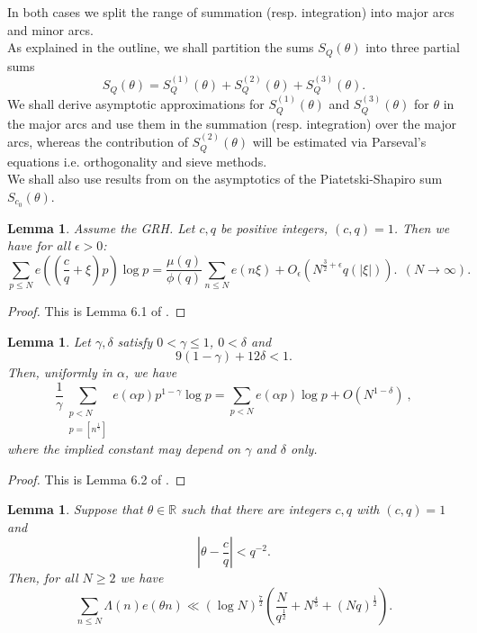 \documentclass{amsart}
\newtheorem{lemma}[theorem]{Lemma}
\numberwithin{equation}{subsection}
\begin{document}
In both cases we split the range of summation (resp. integration) into major arcs and minor arcs.\\
As explained in the outline, we shall partition the sums $S_Q(\theta)$ into three partial sums 
$$S_Q(\theta)=S_Q^{(1)}(\theta)+S_Q^{(2)}(\theta)+S_Q^{(3)}(\theta).$$
We shall derive asymptotic approximations for $S_Q^{(1)}(\theta)$ and $S_Q^{(3)}(\theta)$ for $\theta$ in the major arcs and use them in the summation (resp. integration) over the major arcs, whereas the contribution of $S_Q^{(2)}(\theta)$ will be estimated via Parseval's equations i.e. orthogonality and sieve methods.\\
We shall also use results from \cite{maier-rassias-gold} on the asymptotics of the Piatetski-Shapiro sum $S_{c_0}(\theta)$.



\begin{lemma}\label{lem51}
Assume  the GRH. Let $c, q$ be positive integers, $(c,q)=1$. Then we have for all $\epsilon>0$:
$$\sum_{p\leq N} e\left(\left(\frac{c}{q}+\xi\right)p\right)\log p=\frac{\mu(q)}{\phi(q)} \sum_{n\leq N} e(n\xi)+O_\epsilon(N^{\frac{3}{2}+\epsilon} q(|\xi|)).\ \ (N\rightarrow \infty).$$
\end{lemma}

\begin{proof}
This is Lemma 6.1 of \cite{maier-rassias-gold}.
\end{proof}

\begin{lemma}\label{lem52}
Let $\gamma, \delta$ satisfy $0<\gamma\leq 1$, $0<\delta$ and 
$$9(1-\gamma)+12\delta<1.$$
Then, uniformly in $\alpha$, we have
$$\frac{1}{\gamma}\sum_{\substack{p<N \\ p=[n^{\frac{1}{\gamma}}]  }} e(\alpha p) p^{1-\gamma}\log p=\sum_{p<N}e(\alpha p)\log p+O(N^{1-\delta})\:,$$
where the implied constant may depend on $\gamma$ and $\delta$ only.
\end{lemma}
\begin{proof}
This is Lemma 6.2 of \cite{maier-rassias-gold}.
\end{proof}

\begin{lemma}\label{lem53}
Suppose that $\theta\in\mathbb{R}$ such that there are integers $c,q$ with $(c,q)=1$ and 
$$\left|\theta-\frac{c}{q}\right|< q^{-2}.$$
Then, for all $N\geq 2$ we have
$$\sum_{n\leq N} \Lambda(n)e(\theta n)\ll (\log N)^{\frac{7}{2}}\left(\frac{N}{q^{\frac{1}{2}}}+N^{\frac{4}{5}}+(Nq)^{\frac{1}{2}}\right).$$
\end{lemma}
\end{document}
